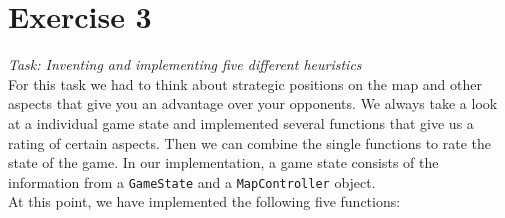 \section*{Exercise 3}
\textit{Task: Inventing and implementing five different heuristics}\\

\noindent For this task we had to think about strategic positions on the map and other aspects that give you an advantage over your opponents. We always take a look at a individual game state and implemented several functions that give us a rating of certain aspects. Then we can combine the single functions to rate the state of the game. In our implementation, a game state consists of the information from a \texttt{GameState} and a \texttt{MapController} object. \\
At this point, we have implemented the following five functions:

